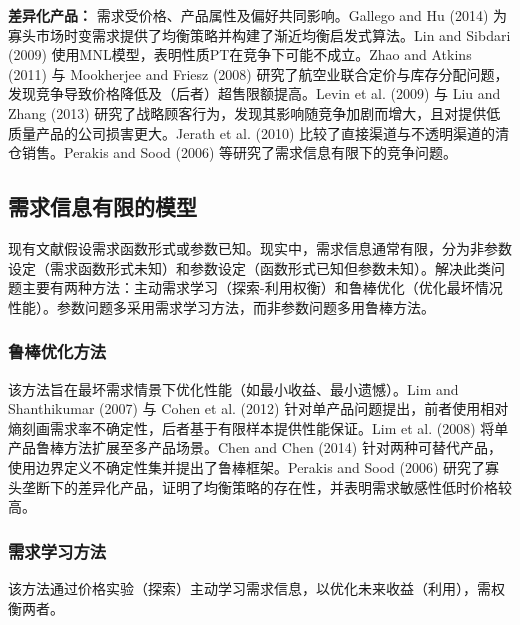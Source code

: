 \textbf{差异化产品：}
需求受价格、产品属性及偏好共同影响。Gallego and Hu (2014) 为寡头市场时变需求提供了均衡策略并构建了渐近均衡启发式算法。Lin and Sibdari (2009) 使用MNL模型，表明性质PT在竞争下可能不成立。Zhao and Atkins (2011) 与 Mookherjee and Friesz (2008) 研究了航空业联合定价与库存分配问题，发现竞争导致价格降低及（后者）超售限额提高。Levin et al. (2009) 与 Liu and Zhang (2013) 研究了战略顾客行为，发现其影响随竞争加剧而增大，且对提供低质量产品的公司损害更大。Jerath et al. (2010) 比较了直接渠道与不透明渠道的清仓销售。Perakis and Sood (2006) 等研究了需求信息有限下的竞争问题。

\subsection{需求信息有限的模型}\label{models-with-limited-demand-information}

现有文献假设需求函数形式或参数已知。现实中，需求信息通常有限，分为非参数设定（需求函数形式未知）和参数设定（函数形式已知但参数未知）。解决此类问题主要有两种方法：主动需求学习（探索-利用权衡）和鲁棒优化（优化最坏情况性能）。参数问题多采用需求学习方法，而非参数问题多用鲁棒方法。

\subsubsection{鲁棒优化方法}\label{robust-optimization-approaches}

该方法旨在最坏需求情景下优化性能（如最小收益、最小遗憾）。Lim and Shanthikumar (2007) 与 Cohen et al. (2012) 针对单产品问题提出，前者使用相对熵刻画需求率不确定性，后者基于有限样本提供性能保证。Lim et al. (2008) 将单产品鲁棒方法扩展至多产品场景。Chen and Chen (2014) 针对两种可替代产品，使用边界定义不确定性集并提出了鲁棒框架。Perakis and Sood (2006) 研究了寡头垄断下的差异化产品，证明了均衡策略的存在性，并表明需求敏感性低时价格较高。

\subsubsection{需求学习方法}\label{demand-learning-approaches}

该方法通过价格实验（探索）主动学习需求信息，以优化未来收益（利用），需权衡两者。

